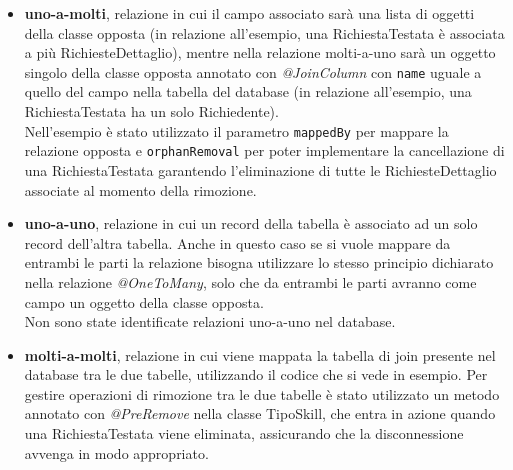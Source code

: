 \begin{itemize}
\item \textbf{uno-a-molti}, relazione in cui il campo associato sarà una lista di oggetti della classe opposta (in relazione all'esempio, una RichiestaTestata è associata a più RichiesteDettaglio), mentre nella relazione molti-a-uno sarà un oggetto singolo della classe opposta annotato con \textit{@JoinColumn} con \texttt{name} uguale a quello del campo nella tabella del database (in relazione all'esempio, una RichiestaTestata ha un solo Richiedente).\\
Nell'esempio è stato utilizzato il parametro \texttt{mappedBy} per mappare la relazione opposta e \texttt{orphanRemoval} per poter implementare la cancellazione di una RichiestaTestata garantendo l'eliminazione di tutte le RichiesteDettaglio associate al momento della rimozione.
\item \textbf{uno-a-uno}, relazione in cui un record della tabella è associato ad un solo record dell'altra tabella. Anche in questo caso se si vuole mappare da entrambi le parti la relazione bisogna utilizzare lo stesso principio dichiarato nella relazione \textit{@OneToMany}, solo che da entrambi le parti avranno come campo un oggetto della classe opposta.\\
Non sono state identificate relazioni uno-a-uno nel database.
\item \textbf{molti-a-molti}, relazione in cui viene mappata la tabella di join presente nel database tra le due tabelle, utilizzando il codice che si vede in esempio.
Per gestire operazioni di rimozione tra le due tabelle è stato utilizzato un metodo annotato con \textit{@PreRemove} nella classe TipoSkill, che entra in azione quando una RichiestaTestata viene eliminata, assicurando che la disconnessione avvenga in modo appropriato.
\end{itemize}